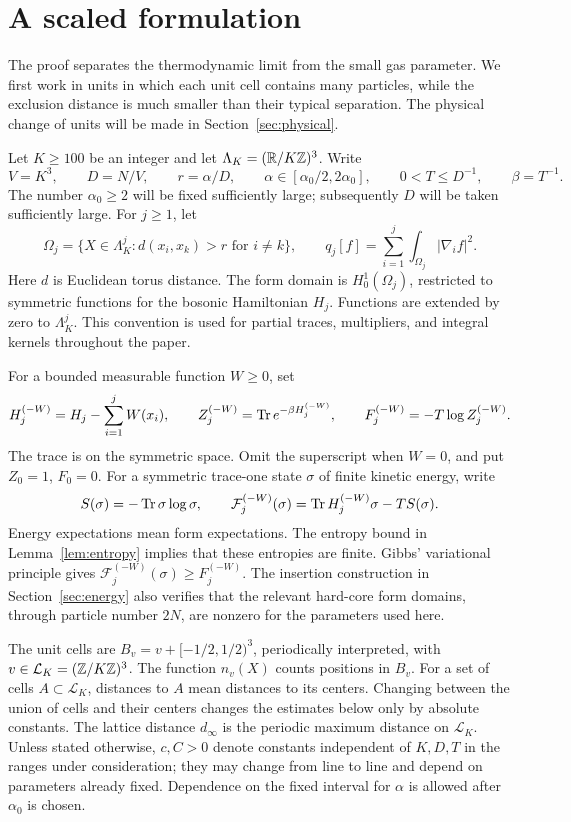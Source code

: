 \section{A scaled formulation}\label{sec:setup}

The proof separates the thermodynamic limit from the small gas parameter.
We first work in units in which each unit cell contains many particles,
while the exclusion distance is much smaller than their typical separation.
The physical change of units will be made in Section~\ref{sec:physical}.

Let $K\ge100$ be an integer and let $\Lambda_K=(\mathbb R/K\mathbb Z)^3$.
Write
\begin{equation}\label{eq:scaled-parameters}
 V=K^3,\qquad D=N/V,\qquad r=\alpha/D,\qquad
 \alpha\in[\alpha_0/2,2\alpha_0],\qquad 0<T\le D^{-1},\qquad \beta=T^{-1}.
\end{equation}
The number $\alpha_0\ge2$ will be fixed sufficiently large; subsequently
$D$ will be taken sufficiently large. For $j\ge1$, let
\[
 \Omega_j=\{X\in\Lambda_K^j:d(x_i,x_k)>r\text{ for }i\ne k\},
 \qquad q_j[f]=\sum_{i=1}^j\int_{\Omega_j}|\nabla_i f|^2.
\]
Here $d$ is Euclidean torus distance. The form domain is
$H^1_0(\Omega_j)$, restricted to symmetric functions for the bosonic
Hamiltonian $H_j$. Functions are extended by zero to $\Lambda_K^j$.
This convention is used for partial traces, multipliers, and integral
kernels throughout the paper.

For a bounded measurable function $W\ge0$, set
\[
 H_j^{(-W)}=H_j-\sum_{i=1}^jW(x_i),\qquad
 Z_j^{(-W)}=\operatorname{Tr} e^{-\beta H_j^{(-W)}},\qquad
 F_j^{(-W)}=-T\log Z_j^{(-W)}.
\]
The trace is on the symmetric space. Omit the superscript when $W=0$,
and put $Z_0=1$, $F_0=0$. For a symmetric trace-one state $\sigma$ of
finite kinetic energy, write
\[
 S(\sigma)=-\operatorname{Tr}\sigma\log\sigma,\qquad
 \mathcal F_j^{(-W)}(\sigma)
 =\operatorname{Tr} H_j^{(-W)}\sigma-TS(\sigma).
\]
Energy expectations mean form expectations. The entropy bound in
Lemma~\ref{lem:entropy} implies that these entropies are finite.
Gibbs' variational principle gives
$\mathcal F_j^{(-W)}(\sigma)\ge F_j^{(-W)}$.
The insertion construction in Section~\ref{sec:energy} also verifies that
the relevant hard-core form domains, through particle number $2N$, are
nonzero for the parameters used here.

The unit cells are
$B_v=v+[-1/2,1/2)^3$, periodically interpreted, with
$v\in\mathcal L_K=(\mathbb Z/K\mathbb Z)^3$. The function $n_v(X)$ counts positions
in $B_v$. For a set of cells $A\subset\mathcal L_K$, distances to $A$
mean distances to its centers. Changing between the union of cells and
their centers changes the estimates below only by absolute constants.
The lattice distance $d_\infty$ is the periodic maximum distance on
$\mathcal L_K$. Unless stated otherwise, $c,C>0$ denote constants
independent of $K,D,T$ in the ranges under consideration; they may change
from line to line and depend on parameters already fixed. Dependence on
the fixed interval for $\alpha$ is allowed after $\alpha_0$ is chosen.

